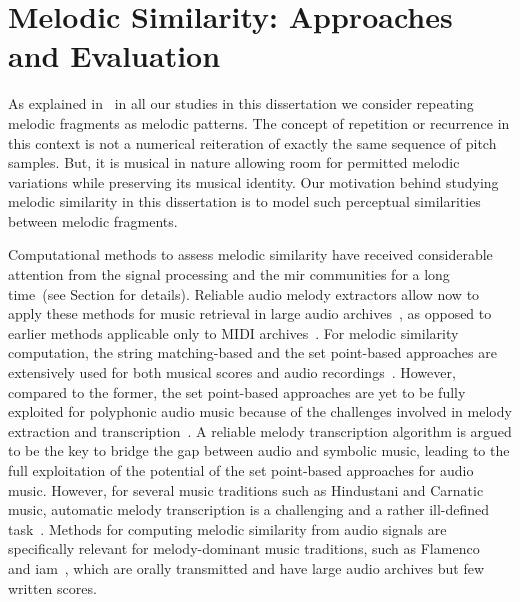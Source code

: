 


\section{Melodic Similarity: Approaches and Evaluation}
\label{sec:patterns_evaluation_of_similarity_measures}

As explained in~ in all our studies in this dissertation we consider repeating melodic fragments as melodic patterns. The concept of repetition or recurrence in this context is not a numerical reiteration of exactly the same sequence of pitch samples. But, it is musical in nature allowing room for permitted melodic variations while preserving its musical identity. Our motivation behind studying melodic similarity in this dissertation is to model such perceptual similarities between melodic fragments. 

Computational methods to assess melodic similarity have received considerable attention from the signal processing and the \gls{mir} communities for a long time~\citep{ghias1995query,hewlett1998melodic,casey2008content,typke2007music}(see Section  for details). Reliable audio melody extractors allow now to apply these methods for music retrieval in large audio archives~\citep{ryynanen2008query,zhu2003warping}, as opposed to earlier methods applicable only to MIDI archives~\citep{RBDannenberg2007QBH}. For melodic similarity computation, the string matching-based and the set point-based approaches are extensively used for both musical scores and audio recordings~\cite{typke2007music}. However, compared to the former, the set point-based approaches are yet to be fully exploited for polyphonic audio music because of the challenges involved in melody extraction and transcription~\cite{collins2014bridging}. A reliable melody transcription algorithm is argued to be the key to bridge the gap between audio and symbolic music, leading to the full exploitation of the potential of the set point-based approaches for audio music. However, for several music traditions such as Hindustani and Carnatic music, automatic melody transcription is a challenging and a rather ill-defined task~\cite{Rao2012}. Methods for computing melodic similarity from audio signals are specifically relevant for melody-dominant music traditions, such as Flamenco~\citep{Pikrakis2012} and \gls{iam}~\citep{Rao2014}, which are orally transmitted and have large audio archives but few written scores. 

